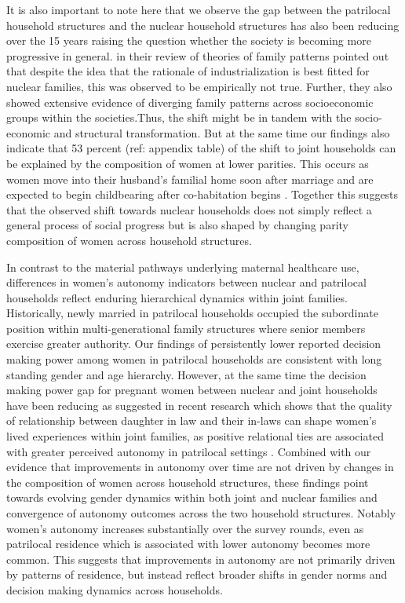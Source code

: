 \documentclass[12pt]{article}
\begin{document}
It is also important to note here that we observe the gap between the patrilocal household structures and the nuclear household structures has also been reducing over the 15 years raising the question whether the society is becoming more progressive in general. \cite{pesando2019rethinking} in their review of \cite{goode1963world} theories of family patterns pointed out that despite the idea that the rationale of industrialization is best fitted for nuclear families, this was observed to be empirically not true. Further, they also showed extensive evidence of diverging family patterns across socioeconomic groups within the societies.Thus, the shift might be in tandem with the socio-economic and structural transformation.  But at the same time our findings also indicate that 53 percent (ref: appendix table) of the shift to joint households can be explained by the composition of women at lower parities. This occurs as women move into their husband’s familial home soon after marriage \cite{breton2021modernisation} and are expected to begin childbearing after co-habitation begins \cite{ibarra2020desire}. Together this suggests that the observed shift towards nuclear households does not simply reflect a general process of social progress but is also shaped by changing parity composition of women across household structures. 

In contrast to the material pathways underlying maternal healthcare use, differences in women’s autonomy indicators between nuclear and patrilocal households reflect enduring hierarchical dynamics within joint families. Historically, newly married in patrilocal households occupied the subordinate position within multi-generational family structures where senior members exercise greater authority. Our findings of persistently lower reported decision making power among women in patrilocal households are consistent with long standing gender and age hierarchy. However, at the same time the decision making power gap for pregnant women between nuclear and joint households have been reducing as suggested in recent research which shows  that the quality of relationship between daughter in law and their in-laws can shape women’s lived experiences within joint families, as positive relational ties are associated with greater perceived autonomy in patrilocal settings \cite{char2010influence}. Combined with our evidence that improvements in autonomy over time are not driven by changes in the composition of women across household structures, these findings point towards evolving gender dynamics within both joint and nuclear families and convergence of autonomy outcomes across the two household structures. Notably women's autonomy increases substantially over the survey rounds, even as patrilocal residence which is associated with lower autonomy  becomes more common. This suggests that improvements in autonomy are not primarily driven by patterns of residence, but instead reflect broader shifts in gender norms and decision making dynamics across households.
\end{document}
